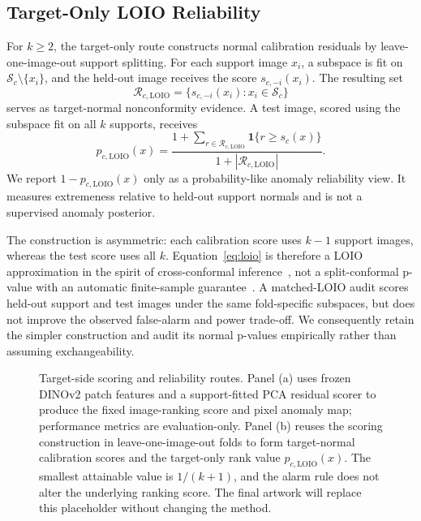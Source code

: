 \subsection{Target-Only LOIO Reliability}
For $k\geq2$, the target-only route constructs normal calibration residuals by leave-one-image-out support splitting. For each support image $x_i$, a subspace is fit on $\mathcal{S}_c\setminus\{x_i\}$, and the held-out image receives the score $s_{c,-i}(x_i)$. The resulting set
\begin{equation}\label{eq:rloio}
    \mathcal{R}_{c,\mathrm{LOIO}}
    =\{s_{c,-i}(x_i):x_i\in\mathcal{S}_c\}
\end{equation}
serves as target-normal nonconformity evidence. A test image, scored using the subspace fit on all $k$ supports, receives
\begin{equation}\label{eq:loio}
    p_{c,\mathrm{LOIO}}(x)
    =\frac{1+\sum_{r\in\mathcal{R}_{c,\mathrm{LOIO}}}
    \mathbf{1}\{r\geq s_c(x)\}}
    {1+|\mathcal{R}_{c,\mathrm{LOIO}}|}.
\end{equation}
We report $1-p_{c,\mathrm{LOIO}}(x)$ only as a probability-like anomaly reliability view. It measures extremeness relative to held-out support normals and is not a supervised anomaly posterior.

The construction is asymmetric: each calibration score uses $k-1$ support images, whereas the test score uses all $k$. Equation~\eqref{eq:loio} is therefore a LOIO approximation in the spirit of cross-conformal inference~\cite{vovk2005,barber2021jackknife,hennhofer2024loio}, not a split-conformal p-value with an automatic finite-sample guarantee~\cite{bates2023testing,laxhammar2015inductive}. A matched-LOIO audit scores held-out support and test images under the same fold-specific subspaces, but does not improve the observed false-alarm and power trade-off. We consequently retain the simpler construction and audit its normal p-values empirically rather than assuming exchangeability.

\begin{figure}[t]
\centering
{}
\caption{Target-side scoring and reliability routes. Panel (a) uses frozen DINOv2 patch features and a support-fitted PCA residual scorer to produce the fixed image-ranking score and pixel anomaly map; performance metrics are evaluation-only. Panel (b) reuses the scoring construction in leave-one-image-out folds to form target-normal calibration scores and the target-only rank value $p_{c,\mathrm{LOIO}}(x)$. The smallest attainable value is $1/(k+1)$, and the alarm rule does not alter the underlying ranking score. The final artwork will replace this placeholder without changing the method.}
\label{fig:target-pipeline}
\end{figure}

